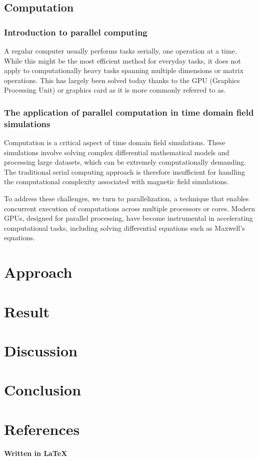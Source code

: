 \documentclass[11pt, a4paper, titlepage]{article}
\begin{document}
\newpage
\subsection{Computation}
\subsubsection{Introduction to parallel computing}
A regular computer usually performs tasks serially, one operation at a time. While this might be the most efficient method for everyday tasks, it does not apply to computationally heavy tasks spanning multiple dimensions or matrix operations. This has largely been solved today thanks to the GPU (Graphics Processing Unit) or graphics card as it is more commonly referred to as.
\subsubsection{The application of parallel computation in time domain field simulations}
Computation is a critical aspect of time domain field simulations. These simulations involve solving complex differential mathematical models and processing large datasets, which can be extremely computationally demanding. The traditional serial computing approach is therefore insufficient for handling the computational complexity associated with magnetic field simulations.

To address these challenges, we turn to parallelization, a technique that enables concurrent execution of computations across multiple processors or cores. Modern GPUs, designed for parallel processing, have become instrumental in accelerating computational tasks, including solving differential equations such as Maxwell's equations.




\newpage
\section{Approach}
\newpage
\section{Result}
\newpage
\section{Discussion}
\newpage
\section{Conclusion}
\newpage
\section{References}

\newpage
\newpage
{} 
\printbibliography




\begin{center}
	\large\textbf{Written in \LaTeX}
\end{center}
\end{document}
